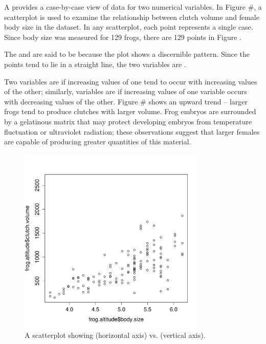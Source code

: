 \begin{doublespace}

A  provides a case-by-case view of data for two numerical variables. In Figure \#, a scatterplot is used to examine the relationship between clutch volume and female body size in the  dataset. In any scatterplot, each point represents a single case. Since body size was measured for 129 frogs, there are 129 points in Figure \label{clutchVolVsBodySize}.

The  and  are said to be  because the plot shows a discernible pattern. Since the points tend to lie in a straight line, the two variables are .

Two variables are  if increasing values of one tend to occur with increasing values of the other; similarly, variables are  if increasing values of one variable occurs with decreasing values of the other. Figure \# shows an upward trend -- larger frogs tend to produce clutches with larger volume. Frog embryos are surrounded by a gelatinous matrix that may protect developing embryos from temperature fluctuation or ultraviolet radiation; these observations suggest that larger females are capable of producing greater quantities of this material.

\begin{figure}
\centering
\includegraphics[width=0.8\textwidth]
{ch_intro_to_data_oi_biostat/figures/clutchVolVsBodySize/clutchVolVsBodySize}
\caption{A scatterplot showing  (horizontal axis) vs.  (vertical axis). }
\label{clutchVolVsBodySize}
\end{figure}



\end{doublespace}
